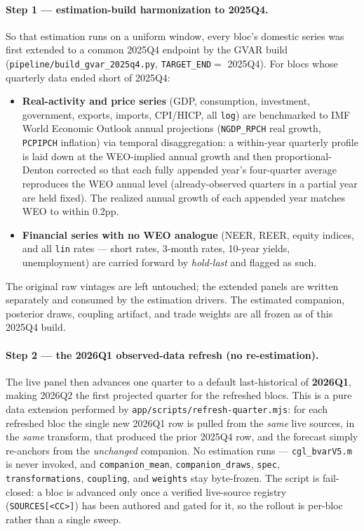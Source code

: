 \documentclass[11pt]{article}
\theoremstyle{definition}
\theoremstyle{remark}
\begin{document}
\paragraph{Step 1 --- estimation-build harmonization to 2025Q4.} So that
estimation runs on a uniform window, every bloc's domestic series was
first extended to a common 2025Q4 endpoint by the GVAR build
(\texttt{pipeline/build\_gvar\_2025q4.py}, \texttt{TARGET\_END}${}={}$%
2025Q4). For blocs whose quarterly data ended short of 2025Q4:
\begin{itemize}
  \item \textbf{Real-activity and price series} (GDP, consumption,
    investment, government, exports, imports, CPI/HICP, all \texttt{log})
    are benchmarked to IMF World Economic Outlook annual projections
    (\texttt{NGDP\_RPCH} real growth, \texttt{PCPIPCH} inflation) via
    temporal disaggregation: a within-year quarterly profile is laid
    down at the WEO-implied annual growth and then proportional-Denton
    corrected so that each fully appended year's four-quarter average
    reproduces the WEO annual level (already-observed quarters in a
    partial year are held fixed). The realized annual growth of each
    appended year matches WEO to within $0.2$pp.
  \item \textbf{Financial series with no WEO analogue} (NEER, REER,
    equity indices, and all \texttt{lin} rates --- short rates, 3-month
    rates, 10-year yields, unemployment) are carried forward by
    \emph{hold-last} and flagged as such.
\end{itemize}
The original raw vintages are left untouched; the extended panels are
written separately and consumed by the estimation drivers. The estimated
companion, posterior draws, coupling artifact, and trade weights are all
frozen as of this 2025Q4 build.

\paragraph{Step 2 --- the 2026Q1 observed-data refresh (no
re-estimation).} The live panel then advances one quarter to a default
last-historical of \textbf{2026Q1}, making 2026Q2 the first projected
quarter for the refreshed blocs. This is a pure data extension performed
by \texttt{app/scripts/refresh-quarter.mjs}: for each refreshed bloc the
single new 2026Q1 row is pulled from the \emph{same} live sources, in the
\emph{same} transform, that produced the prior 2025Q4 row, and the
forecast simply re-anchors from the \emph{unchanged} companion. No
estimation runs --- \texttt{cgl\_bvarV5.m} is never invoked, and
\texttt{companion\_mean}, \texttt{companion\_draws}, \texttt{spec},
\texttt{transformations}, \texttt{coupling}, and \texttt{weights} stay
byte-frozen. The script is fail-closed: a bloc is advanced only once a
verified live-source registry (\texttt{SOURCES[<CC>]}) has been authored
and gated for it, so the rollout is per-bloc rather than a single sweep.
\end{document}
